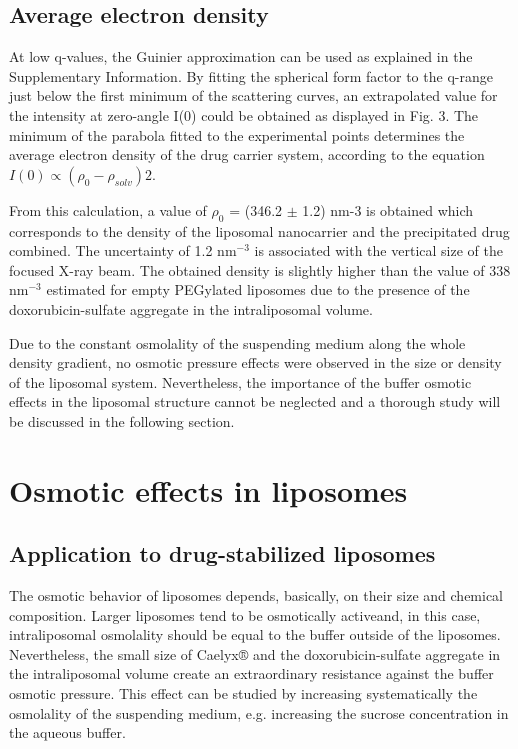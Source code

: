 \subsection{Average electron density}
At low q-values, the Guinier approximation can be used as explained in the Supplementary Information. By fitting the spherical form factor to the q-range just below the first minimum of the scattering curves, an extrapolated value for the intensity at zero-angle I(0) could be obtained as displayed in Fig. 3. The minimum of the parabola fitted to the experimental points determines the average electron density of the drug carrier system, according to the equation $I(0) \propto (\rho_0-\rho_{solv})2$.

From this calculation, a value of $\rho_0$ = (346.2 $\pm$ 1.2) nm-3 is obtained which corresponds to the density of the liposomal nanocarrier and the precipitated drug combined. The uncertainty of 1.2 nm$^{-3}$ is associated with the vertical size of the focused X-ray beam. The obtained density is slightly higher than the value of 338 nm$^{-3}$ estimated for empty PEGylated liposomes due to the presence of the doxorubicin-sulfate aggregate in the intraliposomal volume. 

Due to the constant osmolality of the suspending medium along the whole density gradient, no osmotic pressure effects were observed in the size or density of the liposomal system. Nevertheless, the importance of the buffer osmotic effects in the liposomal structure cannot be neglected and a thorough study will be discussed in the following section.

\section{Osmotic effects in liposomes}
\subsection{Application to drug-stabilized liposomes}
The osmotic behavior of liposomes depends, basically, on their size and chemical composition. Larger liposomes tend to be osmotically activeand, in this case, intraliposomal osmolality should be equal to the buffer outside of the liposomes. Nevertheless, the small size of Caelyx® and the doxorubicin-sulfate aggregate in the intraliposomal volume create an extraordinary resistance against the buffer osmotic pressure. This effect can be studied by increasing systematically the osmolality of the suspending medium, e.g. increasing the sucrose concentration in the aqueous buffer.

